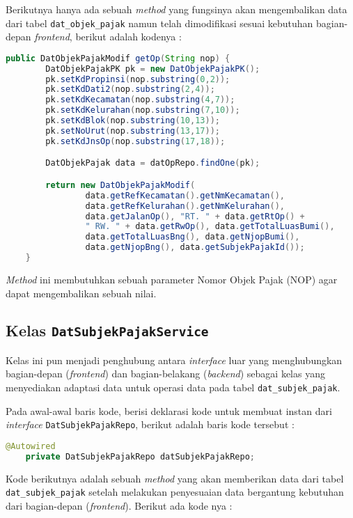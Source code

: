 \documentclass[pdftex,12pt, oneside]{article}
\begin{document}
Berikutnya hanya ada sebuah \textit{method} yang fungsinya akan mengembalikan data dari tabel \texttt{dat\_objek\_pajak} namun telah dimodifikasi sesuai kebutuhan bagian-depan \textit{frontend}, berikut adalah kodenya :

\begin{lstlisting}[language=java]
    public DatObjekPajakModif getOp(String nop) {
        DatObjekPajakPK pk = new DatObjekPajakPK();
        pk.setKdPropinsi(nop.substring(0,2));
        pk.setKdDati2(nop.substring(2,4));
        pk.setKdKecamatan(nop.substring(4,7));
        pk.setKdKelurahan(nop.substring(7,10));
        pk.setKdBlok(nop.substring(10,13));
        pk.setNoUrut(nop.substring(13,17));
        pk.setKdJnsOp(nop.substring(17,18));

        DatObjekPajak data = datOpRepo.findOne(pk);

        return new DatObjekPajakModif(
                data.getRefKecamatan().getNmKecamatan(),
                data.getRefKelurahan().getNmKelurahan(), 
                data.getJalanOp(), "RT. " + data.getRtOp() + 
                " RW. " + data.getRwOp(), data.getTotalLuasBumi(),
                data.getTotalLuasBng(), data.getNjopBumi(), 
                data.getNjopBng(), data.getSubjekPajakId());
    }
\end{lstlisting}

\textit{Method} ini membutuhkan sebuah parameter Nomor Objek Pajak (NOP) agar dapat mengembalikan sebuah nilai.

\subsection{Kelas \texttt{DatSubjekPajakService}}

Kelas ini pun menjadi penghubung antara \textit{interface} luar yang menghubungkan bagian-depan (\textit{frontend}) dan bagian-belakang (\textit{backend}) sebagai kelas yang menyediakan adaptasi data untuk operasi data pada tabel \texttt{dat\_subjek\_pajak}.

Pada awal-awal baris kode, berisi deklarasi kode untuk membuat instan dari \textit{interface} \texttt{DatSubjekPajakRepo}, berikut adalah baris kode tersebut :

\begin{lstlisting}[language=java]
    @Autowired
    private DatSubjekPajakRepo datSubjekPajakRepo;
\end{lstlisting}

Kode berikutnya adalah sebuah \textit{method} yang akan memberikan data dari tabel \texttt{dat\_subjek\_pajak} setelah melakukan penyesuaian data bergantung kebutuhan dari bagian-depan (\textit{frontend}). Berikut ada kode nya :
\end{document}
